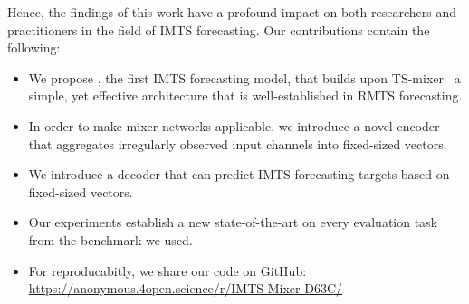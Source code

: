 Hence, the findings of this work have a profound impact on both researchers and practitioners in the field of IMTS forecasting.
Our contributions contain the following:
\begin{itemize}
    \item We propose \model{}, the first IMTS forecasting model, that builds upon TS-mixer~\cite{Ekambaram2023.TSMixer,Chen2023.TSMixer} a simple, yet effective architecture that is well-established in RMTS forecasting.
    \item In order to make mixer networks applicable, we introduce a novel encoder that aggregates irregularly observed input channels into fixed-sized vectors.   
    \item We introduce a decoder that can predict IMTS forecasting targets based on fixed-sized vectors. 
    \item Our experiments establish a new state-of-the-art on every evaluation task from the benchmark we used.
    \item For reproducabitly, we share our code on GitHub: \newline
    \url{https://anonymous.4open.science/r/IMTS-Mixer-D63C/}
\end{itemize}

